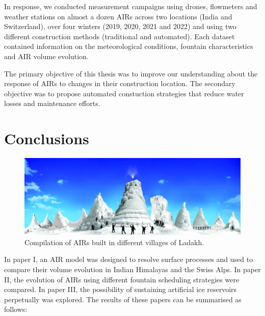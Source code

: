 In response, we conducted measurement campaigns using drones, flowmeters and weather stations on almost a dozen
AIRs across two locations (India and Switzerland), over four winters (2019, 2020, 2021 and 2022) and using two
different construction methods (traditional and automated). Each dataset contained information on the
meteorological conditions, fountain characteristics and AIR volume evolution. 

The primary objective of this thesis was to improve our understanding about the response of AIRs to changes in
their construction location. The secondary objective was to propose automated constuction strategies that reduce
water losses and maintenance efforts.  

\section{Conclusions}

\begin{figure}[htb]
	\includegraphics[width=\textwidth]{figs/AIRs_Ladakh}
	\caption{Compilation of AIRs built in different villages of Ladakh.}
	\label{fig:airs_ladakh}
\end{figure}

In paper I, an AIR model was designed to resolve surface processes and used to compare their volume evolution
in Indian Himalayas and the Swiss Alps. In paper II, the evolution of AIRs using different fountain
scheduling strategies were compared. In paper III, the possibility of sustaining artificial ice reservoirs
perpetually was explored. The results of these papers can be summarised as follows:

